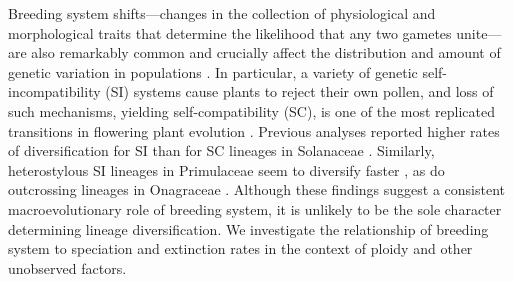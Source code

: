 Breeding system shifts---changes in the collection of physiological and morphological traits that determine the likelihood that any two gametes unite---are also remarkably common and crucially affect the distribution and amount of genetic variation in populations \citep{barrett2013}. 
In particular, a variety of genetic self-incompatibility (SI) systems cause plants to reject their own pollen, and loss of such mechanisms, yielding self-compatibility (SC), is one of the most replicated transitions in flowering plant evolution \citep{stebbins1974, igic_2008}.
Previous analyses reported higher rates of diversification for SI than for SC lineages in Solanaceae \citep{goldberg_2010}. 
Similarly, heterostylous SI lineages in Primulaceae seem to diversify faster \citep{devos2014}, as do outcrossing lineages in Onagraceae \citep{freyman_2019}.
Although these findings suggest a consistent macroevolutionary role of breeding system, it is unlikely to be the sole character determining lineage diversification.
We investigate the relationship of breeding system to speciation and extinction rates in the context of ploidy and other unobserved factors.

